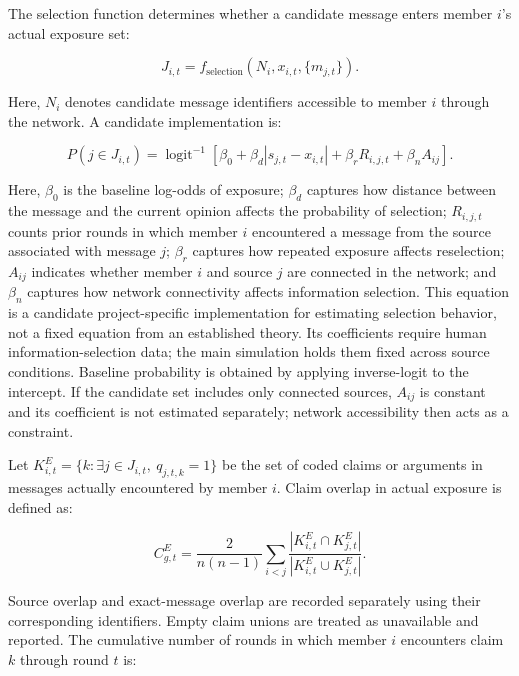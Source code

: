 \documentclass[11pt,a4paper]{article}
\begin{document}
The selection function determines whether a candidate message enters member $i$'s actual exposure set:

\begin{equation*}
J_{i,t}
=
f_{\text{selection}}
(N_i,x_{i,t},\{m_{j,t}\}).
\end{equation*}

Here, $N_i$ denotes candidate message identifiers accessible to member $i$ through the network. A candidate implementation is:

\begin{equation*}
P(j\in J_{i,t})
=
\operatorname{logit}^{-1}
\left[
\beta_0
+
\beta_d|s_{j,t}-x_{i,t}|
+
\beta_rR_{i,j,t}
+
\beta_nA_{ij}
\right].
\end{equation*}

Here, $\beta_0$ is the baseline log-odds of exposure; $\beta_d$ captures how distance between the message and the current opinion affects the probability of selection; $R_{i,j,t}$ counts prior rounds in which member $i$ encountered a message from the source associated with message $j$; $\beta_r$ captures how repeated exposure affects reselection; $A_{ij}$ indicates whether member $i$ and source $j$ are connected in the network; and $\beta_n$ captures how network connectivity affects information selection. This equation is a candidate project-specific implementation for estimating selection behavior, not a fixed equation from an established theory. Its coefficients require human information-selection data; the main simulation holds them fixed across source conditions. Baseline probability is obtained by applying inverse-logit to the intercept. If the candidate set includes only connected sources, $A_{ij}$ is constant and its coefficient is not estimated separately; network accessibility then acts as a constraint.

Let $K^{E}_{i,t}=\{k:\exists j\in J_{i,t},\ q_{j,t,k}=1\}$ be the set of coded claims or arguments in messages actually encountered by member $i$. Claim overlap in actual exposure is defined as:

\begin{equation*}
C^{E}_{g,t}
=
\frac{2}{n(n-1)}
\sum_{i<j}
\frac{|K^{E}_{i,t}\cap K^{E}_{j,t}|}
{|K^{E}_{i,t}\cup K^{E}_{j,t}|}.
\end{equation*}

Source overlap and exact-message overlap are recorded separately using their corresponding identifiers. Empty claim unions are treated as unavailable and reported. The cumulative number of rounds in which member $i$ encounters claim $k$ through round $t$ is:
\end{document}
